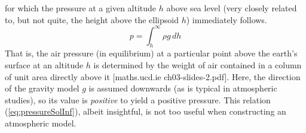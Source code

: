 \documentclass[11pt,dvipsnames]{thesis}
\begin{document}
%
for which the pressure at a given altitude $h$ above 
sea level (very closely related to, but not quite, the height above the ellipsoid $h$)  %
immediately follows.
\begin{equation}
p = \int_h^\infty \rho g \,dh \label{eq:pressureSolInf}
\end{equation}
That is, the air pressure (in equilibrium) at a particular point above the earth's surface at an altitude $h$ is determined by the weight of air contained in a column of unit area directly above it [maths.ucd.ie ch03-slides-2.pdf]. Here, the direction of the gravity model $g$ is assumed downwards (as is typical in atmospheric studies), so its value is \textit{positive} to yield a positive pressure. 
This relation (\ref{eq:pressureSolInf}), albeit insightful, is not too useful when constructing an atmospheric model.
\end{document}
